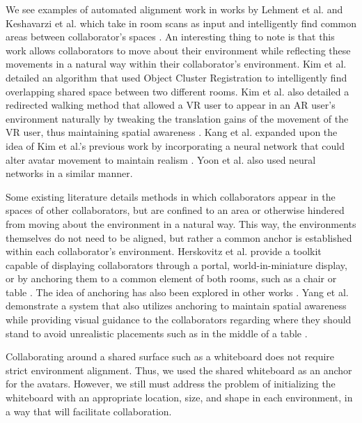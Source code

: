 We see examples of automated alignment work in works by Lehment et al. and Keshavarzi et al. which take in room scans as input and intelligently find common areas between collaborator's spaces \cite{lehment_creating_2014, keshavarzi_optimization_2020}. An interesting thing to note is that this work allows collaborators to move about their environment while reflecting these movements in a natural way within their collaborator's environment. Kim et al. detailed an algorithm that used Object Cluster Registration to intelligently find overlapping shared space between two different rooms\cite{kim_object_2024}. Kim et al. also detailed a redirected walking method that allowed a VR user to appear in an AR user's environment naturally by tweaking the translation gains of the movement of the VR user, thus maintaining spatial awareness \cite{kim_adjusting_2021}. Kang et al. expanded upon the idea of Kim et al.'s previous work by incorporating a neural network that could alter avatar movement to maintain realism \cite{kang_real-time_2023}. Yoon et al. also used neural networks in a similar manner\cite{yoon_placement_2022}.  

Some existing literature details methods in which collaborators appear in the spaces of other collaborators, but are confined to an area or otherwise hindered from moving about the environment in a natural way. This way, the environments themselves do not need to be aligned, but rather a common anchor is established within each collaborator's environment. Herskovitz et al. provide a toolkit capable of displaying collaborators through a portal, world-in-miniature display, or by anchoring them to a common element of both rooms, such as a chair or table \cite{herskovitz_xspace_2022}. The idea of anchoring has also been explored in other works \cite{gronbaek_partially_2023, fink_re-locations_2022, huang_surfshare_2023}. Yang et al. demonstrate a system that also utilizes anchoring to maintain spatial awareness while providing visual guidance to the collaborators regarding where they should stand to avoid unrealistic placements such as in the middle of a table \cite{yang_visual_2024}.

Collaborating around a shared surface such as a whiteboard does not require strict environment alignment. Thus, we used the shared whiteboard as an anchor for the avatars. However, we still must address the problem of initializing the whiteboard with an appropriate location, size, and shape in each environment, in a way that will facilitate collaboration.